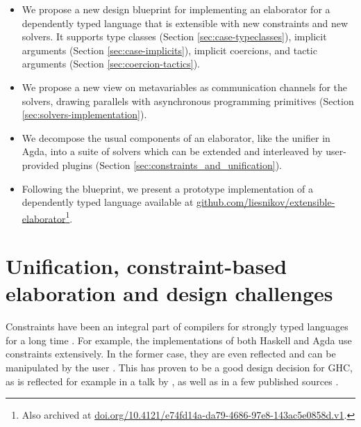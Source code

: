 \begin{itemize}
\tightlist
\item
  We propose a new design blueprint for implementing an elaborator for a
  dependently typed language that is extensible with new constraints and
  new solvers. It supports type classes (Section
  \ref{sec:case-typeclasses}), implicit arguments (Section
  \ref{sec:case-implicits}), implicit coercions, and tactic arguments
  (Section \ref{sec:coercion-tactics}).
\item
  We propose a new view on metavariables as communication channels for
  the solvers, drawing parallels with asynchronous programming
  primitives (Section \ref{sec:solvers-implementation}).
\item
  We decompose the usual components of an elaborator, like the unifier
  in Agda, into a suite of solvers which can be extended and interleaved
  by user-provided plugins (Section
  \ref{sec:constraints_and_unification}).
\item
  Following the blueprint, we present a prototype implementation of a
  dependently typed language available at
  \href{https://github.com/liesnikov/extensible-elaborator}{github.com/liesnikov/extensible-elaborator}\footnote{Also archived at \href{https://doi.org/10.4121/e74fd14a-da79-4686-97e8-143ac5e0858d.v1}{doi.org/10.4121/e74fd14a-da79-4686-97e8-143ac5e0858d.v1}.}.
\end{itemize}

\hypertarget{sec:unification_constraint_based_elaboration_and_design_challanges}{%
\section{Unification, constraint-based elaboration and design
challenges}\label{sec:unification_constraint_based_elaboration_and_design_challanges}}

Constraints have been an integral part of compilers for strongly typed
languages for a long time \citep{oderskyTypeInferenceConstrained1999}.
For example, the implementations of both Haskell
\citep{vytiniotisOutsideInModularType2011} and Agda \citep[
chap.~3]{norellPracticalProgrammingLanguage2007} use constraints
extensively. In the former case, they are even reflected and can be
manipulated by the user
\citetext{\citealp[chap.~6.10.3]{orchardHaskellTypeConstraints2010a}; \citealp{ghcdevelopmentteamGHCUserGuide2022}}.
This has proven to be a good design decision for GHC, as is reflected
for example in a talk by \citet{peytonjonesTypeInferenceConstraint2019},
as well as in a few published sources
\citep{vytiniotisOutsideInModularType2011, peytonjonesPracticalTypeInference2007}.

